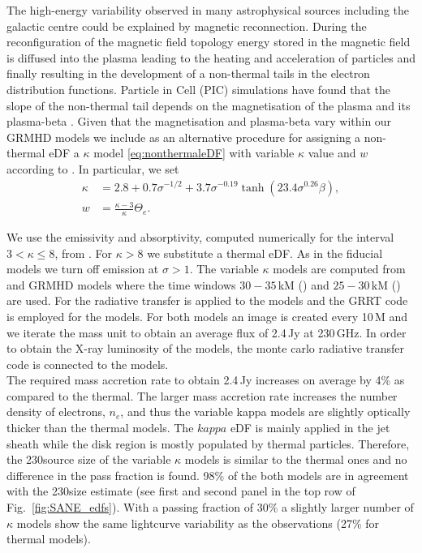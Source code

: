 The high-energy variability observed in many astrophysical sources including the galactic centre could be explained by magnetic reconnection.
During the reconfiguration of the magnetic field topology energy stored in the magnetic field is diffused into the plasma leading to the heating and acceleration of particles and finally resulting in the development of a non-thermal tails in the electron distribution functions.
Particle in Cell (PIC) simulations have found that the slope of the non-thermal tail depends on the magnetisation of the plasma and its plasma-beta \citep[see, e.g.,][]{2018ApJ...862...80B}.
Given that the magnetisation and plasma-beta vary within our GRMHD models we include as an alternative procedure for assigning a non-thermal eDF a $\kappa$ model \eqref{eq:nonthermaleDF} with variable $\kappa$ value and $w$ according to \cite{2018ApJ...862...80B}.
In particular, we set
\begin{align}
  \kappa &= 2.8 +0.7\sigma^{-1/2} + 3.7\sigma^{-0.19}\tanh{(23.4\sigma^{0.26}\beta)}, \label{eq:kappa}\\
  w      &= \frac{ \kappa -3 }{\kappa} \Theta_e.
\end{align}

We use the emissivity and absorptivity, computed numerically for the interval $3 < \kappa \le 8$, from  \cite{2016ApJ...822...34P}.
For $\kappa > 8$ we substitute a thermal eDF.
As in the fiducial models we turn off emission at $\sigma > 1$.
{The variable $\kappa$ models are computed from \hamr and \bhac GRMHD models where the time windows $30-35$\,kM (\hamr) and $25-30$\,kM (\bhac) are used.
For the radiative transfer \ipole is applied to the \hamr models and the GRRT code \bhoss is employed for the \bhac models.
For both models an image is created every 10\,M and we iterate the mass unit to obtain an average flux of 2.4\,Jy at 230\,GHz.
In order to obtain the X-ray luminosity of the models, the monte carlo radiative transfer code \grmonty is connected to the \hamr models.}\\
The required mass accretion rate to obtain 2.4\,Jy increases on average by 4\% as compared to the thermal.
The larger mass accretion rate increases the number density of electrons, $n_e$, and thus the variable kappa models are slightly optically thicker than the thermal models.
 The $kappa$ eDF is mainly applied in the jet sheath while the disk region is mostly populated by thermal particles.
Therefore, the 230\GHz source size of the variable $\kappa$ models is similar to the thermal ones and no difference in the pass fraction is found.
98\% of the both models are in agreement with the 230\GHz size estimate (see first and second panel in the top row of Fig.~\ref{fig:SANE_edfs}).
With a passing fraction of 30\% a slightly larger number of $\kappa$ models show the same lightcurve variability as the observations (27\% for thermal models).

